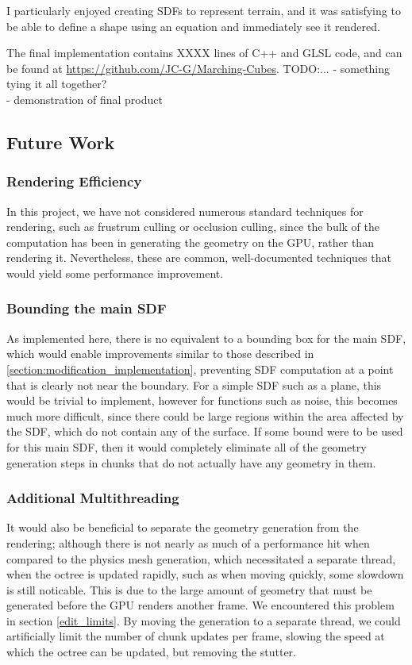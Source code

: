 \documentclass{article}
\begin{document}
I particularly enjoyed creating SDFs to represent terrain, and it was satisfying to be able to define a shape using an equation and immediately see it rendered. 

The final implementation contains XXXX lines of C++ and GLSL code, and can be found at \url{https://github.com/JC-G/Marching-Cubes}.
TODO:...
- something tying it all together?\\
 - demonstration of final product\\



\subsection{Future Work}
\label{section:future_work}
\subsubsection{Rendering Efficiency}
In this project, we have not considered numerous standard techniques for rendering, such as frustrum culling or occlusion culling, since the bulk of the computation has been in generating the geometry on the GPU, rather than rendering it. Nevertheless, these are common, well-documented techniques that would yield some performance improvement.
\subsubsection{Bounding the main SDF}
As implemented here, there is no equivalent to a bounding box for the main SDF, which would enable improvements similar to those described in \ref{section:modification_implementation}, preventing SDF computation at a point that is clearly not near the boundary. For a simple SDF such as a plane, this would be trivial to implement, however for functions such as noise, this becomes much more difficult, since there could be large regions within the area affected by the SDF, which do not contain any of the surface. If some bound were to be used for this main SDF, then it would completely eliminate all of the geometry generation steps in chunks that do not actually have any geometry in them.
\subsubsection{Additional Multithreading}
It would also be beneficial to separate the geometry generation from the rendering; although there is not nearly as much of a performance hit when compared to the physics mesh generation, which necessitated a separate thread, when the octree is updated rapidly, such as when moving quickly, some slowdown is still noticable. This is due to the large amount of geometry that must be generated before the GPU renders another frame. We encountered this problem in section \ref{edit_limits}. By moving the generation to a separate thread, we could artificially limit the number of chunk updates per frame, slowing the speed at which the octree can be updated, but removing the stutter.
\end{document}
